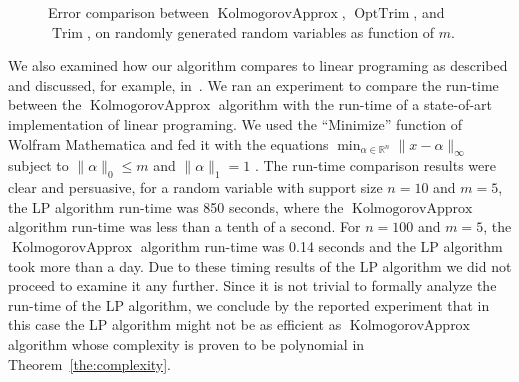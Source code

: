\documentclass{article}
\DeclareMathOperator{\Trim}{Trim}
\DeclareMathOperator{\KlmApprox}{KolmogorovApprox}
\DeclareMathOperator{\OptTrim}{OptTrim}
\begin{document}
\begin{figure}[htb]
	\scriptsize	
	\centering 
	\caption{Error comparison between $\KlmApprox$, $\OptTrim$, and $\Trim$, on randomly generated random variables as function of $m$.}
	\label{fig:error}
\end{figure}


We also examined how our algorithm compares to linear programing as described and discussed, for example, in~\cite{pavlikov2016cvar}. We ran an experiment to compare the run-time between the $\KlmApprox$ algorithm with the run-time of a state-of-art implementation of linear programing. We used the ``Minimize'' function of Wolfram Mathematica and fed it with the equations $\min_{\alpha \in \mathbb{R}^n} \| x - \alpha\|_\infty$ subject to $\|\alpha\|_0 \leq m$ and $\| \alpha \|_1 =1$ . The run-time comparison results were clear and persuasive, for a random variable with support size $n=10$ and $m=5$, the LP algorithm run-time was 850 seconds, where the $\KlmApprox$ algorithm run-time was less than a tenth of a second. For $n=100$ and $m=5$, the $\KlmApprox$ algorithm run-time was 0.14 seconds and the LP algorithm took more than a day. Due to these timing results of the LP algorithm we did not proceed to examine it any further.
Since it is not trivial to formally analyze the run-time of the LP algorithm, we conclude by the reported experiment that in this case the LP algorithm might not be as efficient as $\KlmApprox$ algorithm whose complexity is proven to be polynomial in Theorem~\ref{the:complexity}.
\end{document}
